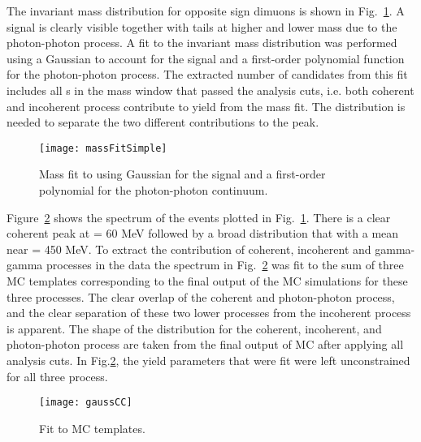     The invariant mass distribution for opposite sign dimuons is shown in 
      Fig.~\ref{fig:massFit}. 
    A \JPsi{} signal is clearly visible together with tails at higher and
      lower mass due to the photon-photon process.
    A fit to the invariant mass distribution was performed using a Gaussian
      to account for the \JPsi{} signal and a first-order polynomial function 
      for the photon-photon process.
    The extracted number of \JPsi{} candidates from this fit includes all 
      \JPsi{}s in the mass window that passed the analysis cuts, i.e. both
      coherent and incoherent process contribute to yield from the mass
      fit.
    The \pt{} distribution is needed to separate the two different 
      contributions to the \JPsi{} peak. 

    \begin{figure}[!Hhtb]
      \centering
      \texttt{[image: massFitSimple]}
      \caption{Mass fit to \JPsi{} using Gaussian for the 
        signal and a first-order polynomial for the photon-photon continuum.}
      \label{fig:massFit}
    \end{figure}

    Figure~\ref{fig:ptTemps} shows the \pt{} spectrum of the events plotted 
      in Fig.~\ref{fig:massFit}.  
    There is a clear coherent peak at \pt{} = 60 MeV followed by a broad 
      distribution that with a mean near \pt{} = 450 MeV. 
    To extract the contribution of coherent, incoherent and gamma-gamma 
      processes in the data the spectrum in  Fig.~\ref{fig:ptTemps} was fit to 
      the sum of three MC templates corresponding to the final output of the MC
      simulations for these three processes.       
    The clear overlap of the coherent and photon-photon process, and the 
      clear separation of these two lower \pt{} processes from the incoherent
      process is apparent.
    The shape of the \pt{} distribution for the coherent, incoherent, and 
      photon-photon process are taken from the final output of MC after
      applying all analysis cuts. 
    In Fig.\ref{fig:ptTemps}, the yield parameters that were fit were left
      unconstrained for all three process.

    \begin{figure}[!Hhbt]
      \centering
      \texttt{[image: gaussCC]}
      \caption{ Fit to MC \pt{} templates. }
      \label{fig:ptTemps}
    \end{figure}

